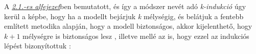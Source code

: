 A \hyperlink{section.2.1}{\emph{2.1.-es alfejezet}}ben bemutatott, és így a módszer nevét adó \emph{k-indukció} úgy kerül a képbe, hogy ha a modellt bejárjuk \emph{k} mélységig, és belátjuk a fentebb említett metodika alapján, hogy a modell biztonságos, akkor kijelenthető, hogy $k+1$ mélységre is biztonságos lesz \cite{donaldson_cikk}, illetve mellé az is, hogy ezzel az indukciós lépést bizonyítottuk \cite{k_induction_article}:












\begin{comment}
\begin{algorithm}[H]
	\SetAlgoLined
	\KwResult{}
	i=0\\
	\While{True}{
		instructions\\
		\eIf{condition}{
			instructions1\\
			instructions2\\
		}{
			instructions3\\
		}
	}
	\caption{Checking if model is \emph{P}-safe}
\end{algorithm}í
\end{comment}

